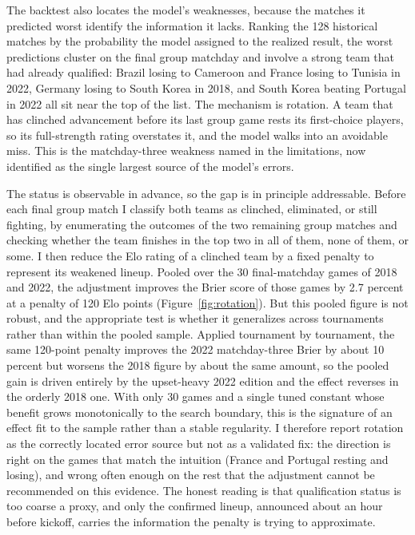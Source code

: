 \documentclass[11pt,letterpaper]{article}
\begin{document}
The backtest also locates the model's weaknesses, because the matches it predicted worst identify the information it lacks. Ranking the 128 historical matches by the probability the model assigned to the realized result, the worst predictions cluster on the final group matchday and involve a strong team that had already qualified: Brazil losing to Cameroon and France losing to Tunisia in 2022, Germany losing to South Korea in 2018, and South Korea beating Portugal in 2022 all sit near the top of the list. The mechanism is rotation. A team that has clinched advancement before its last group game rests its first-choice players, so its full-strength rating overstates it, and the model walks into an avoidable miss. This is the matchday-three weakness named in the limitations, now identified as the single largest source of the model's errors.

The status is observable in advance, so the gap is in principle addressable. Before each final group match I classify both teams as clinched, eliminated, or still fighting, by enumerating the outcomes of the two remaining group matches and checking whether the team finishes in the top two in all of them, none of them, or some. I then reduce the Elo rating of a clinched team by a fixed penalty to represent its weakened lineup. Pooled over the 30 final-matchday games of 2018 and 2022, the adjustment improves the Brier score of those games by 2.7 percent at a penalty of 120 Elo points (Figure~\ref{fig:rotation}). But this pooled figure is not robust, and the appropriate test is whether it generalizes across tournaments rather than within the pooled sample. Applied tournament by tournament, the same 120-point penalty improves the 2022 matchday-three Brier by about 10 percent but worsens the 2018 figure by about the same amount, so the pooled gain is driven entirely by the upset-heavy 2022 edition and the effect reverses in the orderly 2018 one. With only 30 games and a single tuned constant whose benefit grows monotonically to the search boundary, this is the signature of an effect fit to the sample rather than a stable regularity. I therefore report rotation as the correctly located error source but not as a validated fix: the direction is right on the games that match the intuition (France and Portugal resting and losing), and wrong often enough on the rest that the adjustment cannot be recommended on this evidence. The honest reading is that qualification status is too coarse a proxy, and only the confirmed lineup, announced about an hour before kickoff, carries the information the penalty is trying to approximate.
\end{document}
